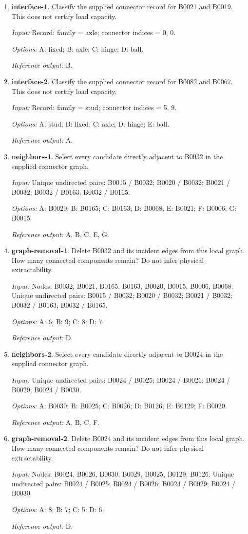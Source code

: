 \begin{enumerate}
\item \textbf{interface-1}. Classify the supplied connector record for B0021 and B0019. This does not certify load capacity.\par {\small \textit{Input:} Record: family = axle; connector indices = 0, 0. \par\textit{Options:} A: fixed; B: axle; C: hinge; D: ball. \par\textit{Reference output:} B.}
\item \textbf{interface-2}. Classify the supplied connector record for B0082 and B0067. This does not certify load capacity.\par {\small \textit{Input:} Record: family = stud; connector indices = 5, 9. \par\textit{Options:} A: stud; B: fixed; C: axle; D: hinge; E: ball. \par\textit{Reference output:} A.}
\item \textbf{neighbors-1}. Select every candidate directly adjacent to B0032 in the supplied connector graph.\par {\small \textit{Input:} Unique undirected pairs: B0015 / B0032; B0020 / B0032; B0021 / B0032; B0032 / B0163; B0032 / B0165. \par\textit{Options:} A: B0020; B: B0165; C: B0163; D: B0068; E: B0021; F: B0006; G: B0015. \par\textit{Reference output:} A, B, C, E, G.}
\item \textbf{graph-removal-1}. Delete B0032 and its incident edges from this local graph. How many connected components remain? Do not infer physical extractability.\par {\small \textit{Input:} Nodes: B0032, B0021, B0165, B0163, B0020, B0015, B0006, B0068. Unique undirected pairs: B0015 / B0032; B0020 / B0032; B0021 / B0032; B0032 / B0163; B0032 / B0165. \par\textit{Options:} A: 6; B: 9; C: 8; D: 7. \par\textit{Reference output:} D.}
\item \textbf{neighbors-2}. Select every candidate directly adjacent to B0024 in the supplied connector graph.\par {\small \textit{Input:} Unique undirected pairs: B0024 / B0025; B0024 / B0026; B0024 / B0029; B0024 / B0030. \par\textit{Options:} A: B0030; B: B0025; C: B0026; D: B0126; E: B0129; F: B0029. \par\textit{Reference output:} A, B, C, F.}
\item \textbf{graph-removal-2}. Delete B0024 and its incident edges from this local graph. How many connected components remain? Do not infer physical extractability.\par {\small \textit{Input:} Nodes: B0024, B0026, B0030, B0029, B0025, B0129, B0126. Unique undirected pairs: B0024 / B0025; B0024 / B0026; B0024 / B0029; B0024 / B0030. \par\textit{Options:} A: 8; B: 7; C: 5; D: 6. \par\textit{Reference output:} D.}

\end{enumerate}
